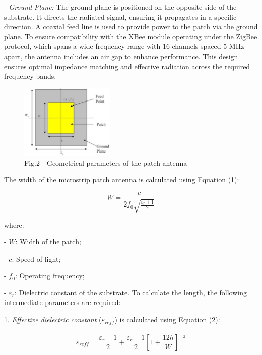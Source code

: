 \begin{multicols}{2}
- \emph{Ground Plane:} The ground plane is positioned on the opposite
side of the substrate. It directs the radiated signal, ensuring it
propagates in a specific direction. A coaxial feed line is used to
provide power to the patch via the ground plane.
To ensure compatibility with the XBee module operating under the ZigBee
protocol, which spans a wide frequency range with 16 channels spaced 5
MHz apart, the antenna includes an air gap to enhance performance. This
design ensures optimal impedance matching and effective radiation across
the required frequency bands.

\begin{figure}[H]
	\centering
	\includegraphics[width=0.4\textwidth]{media/ict/image42}
	\caption*{Fig.2 - Geometrical parameters of the patch antenna}
\end{figure}

The width of the microstrip patch antenna is calculated using Equation
(1):

\begin{equation}
W = \frac{c}{2f_{0}\sqrt{\frac{\varepsilon_{r} + 1}{2}}}
\end{equation}

where:


- \(W\): Width of the patch;

- \(c\): Speed of light;

- \(f_{0}\)\hspace{0pt}: Operating frequency;

- \(\varepsilon_{r}\)\hspace{0pt}: Dielectric constant of the substrate.
To calculate the length, the following intermediate parameters are
required:


1. \emph{Effective dielectric constant} (\(\varepsilon_{reff}\)) is
calculated using Equation (2):

\begin{equation}
\varepsilon_{reff} = \frac{\varepsilon_{r} + 1}{2} + \frac{\varepsilon_{r} - 1}{2}\left\lbrack 1 + \frac{12h}{W} \right\rbrack^{- \frac{1}{2}}
\end{equation}


\end{multicols}
